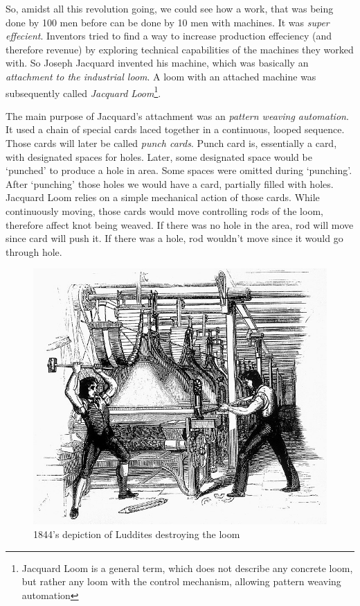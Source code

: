 \documentclass{report}
\begin{document}
            So, amidst all this revolution going, we could see how a work, that was being done by 100 men before can be done by 10 men with machines. It was \emph{super effecient}.
            Inventors tried to find a way to increase production effeciency (and therefore revenue) by exploring technical capabilities of the machines they worked with. So 
            Joseph Jacquard invented his machine, which was basically an \emph{attachment to the industrial loom}. A loom with an attached machine was subsequently called
            \emph{Jacquard Loom}\footnote{Jacquard Loom is a general term, which does not describe any concrete loom, but rather any loom with the control 
            mechanism, allowing pattern weaving automation}. \par

            The main purpose of Jacquard's attachment was an \emph{pattern weaving automation}. It used a chain of special cards laced together in a continuous, looped sequence.
            Those cards will later be called \emph{punch cards}. Punch card is, essentially a card, with designated spaces for holes. Later, some designated space would be `punched'
            to produce a hole in area. Some spaces were omitted during `punching'. After `punching' those holes we would have a card, partially filled with holes. Jacquard Loom
            relies on a simple mechanical action of those cards. While continuously moving, those cards would move controlling rods of the loom, therefore affect knot being weaved. 
            If there was no hole in the area, rod will move since card will push it. If there was a hole, rod wouldn't move since it would go through hole. \par


            \begin{figure}
                \centering
                \includegraphics[scale=0.2]{images/misc/luddites.jpg}
                \caption{1844's depiction of Luddites destroying the loom}
            \end{figure}
\end{document}
